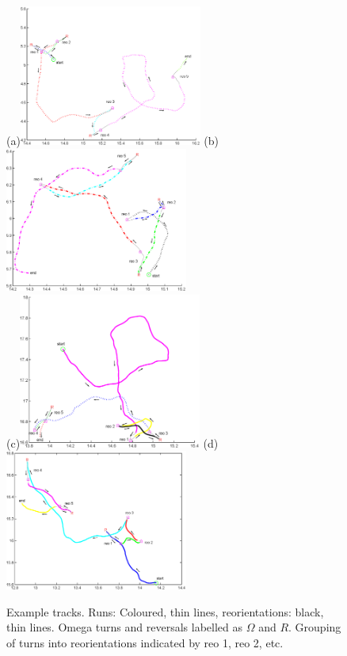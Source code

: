 \documentclass[12pt]{article}
\begin{document}
\begin{figure}
  (a)\includegraphics[width=6cm]{track1.eps}
  (b)\includegraphics[width=6cm]{track2.eps}\\[1cm]
  (c)\includegraphics[width=6cm]{track3.eps}
  (d)\includegraphics[width=6cm]{track4.eps}
  \caption{Example tracks. Runs: Coloured, thin lines, reorientations: black, thin lines. Omega turns and reversals labelled as $\Omega$ and $R$. Grouping of turns into reorientations indicated by reo 1, reo 2, etc.} \label{fig:tracks}
\end{figure}
\end{document}
